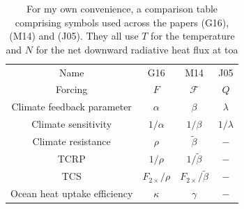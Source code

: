 \documentclass{ametsocV5}
\begin{document}
\begin{table}
  \centering

  \caption{For my own convenience, a comparison table comprising symbols used across the
    papers \citet{gregory2016} (G16), \citet{merlis2014} (M14) and \citet{jones2005} (J05).
    They all use \(T\) for the temperature and \(N\) for the net downward radiative heat
    flux at \ac{toa}}\label{tab:symbol-comparison}%
  \begin{tabular}{cccc}
    Name                         & G16                   & M14                            & J05            \\
    Forcing                      & \(F\)                 & \(\mathcal{F}\)                & \(Q\)          \\
    Climate feedback parameter   & \(\alpha \)           & \(\beta \)                     & \(\lambda \)   \\
    Climate sensitivity          & \(1/\alpha \)         & \(1/\beta \)                   & \(1/\lambda \) \\
    Climate resistance           & \(\rho \)             & \(\tilde{\beta }\)             & \(-\)          \\
    TCRP                         & \(1/\rho \)           & \(1/\tilde{\beta }\)           & \(-\)          \\
    TCS                          & \(F_{2\times}/\rho \) & \(F_{2\times}/\tilde{\beta }\) & \(-\)          \\
    Ocean heat uptake efficiency & \(\kappa \)           & \(\gamma \)                    & \(-\)          \\
  \end{tabular}
\end{table}

\clearpage


\end{document}
